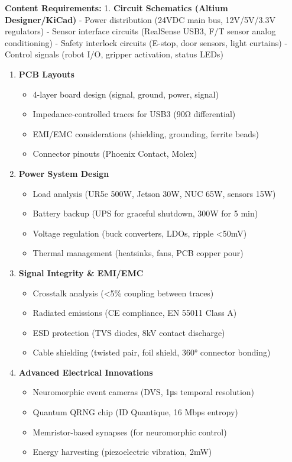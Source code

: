 \documentclass[
]{article}
\providecommand{\tightlist}{%
  \setlength{\itemsep}{0pt}\setlength{\parskip}{0pt}}
\begin{document}
\textbf{Content Requirements:} 1. \textbf{Circuit Schematics (Altium
Designer/KiCad)} - Power distribution (24VDC main bus, 12V/5V/3.3V
regulators) - Sensor interface circuits (RealSense USB3, F/T sensor
analog conditioning) - Safety interlock circuits (E-stop, door sensors,
light curtains) - Control signals (robot I/O, gripper activation, status
LEDs)

\begin{enumerate}
\def\labelenumi{\arabic{enumi}.}
\setcounter{enumi}{1}
\tightlist
\item
  \textbf{PCB Layouts}

  \begin{itemize}
  \tightlist
  \item
    4-layer board design (signal, ground, power, signal)
  \item
    Impedance-controlled traces for USB3 (90Ω differential)
  \item
    EMI/EMC considerations (shielding, grounding, ferrite beads)
  \item
    Connector pinouts (Phoenix Contact, Molex)
  \end{itemize}
\item
  \textbf{Power System Design}

  \begin{itemize}
  \tightlist
  \item
    Load analysis (UR5e 500W, Jetson 30W, NUC 65W, sensors 15W)
  \item
    Battery backup (UPS for graceful shutdown, 300W for 5 min)
  \item
    Voltage regulation (buck converters, LDOs, ripple \textless50mV)
  \item
    Thermal management (heatsinks, fans, PCB copper pour)
  \end{itemize}
\item
  \textbf{Signal Integrity \& EMI/EMC}

  \begin{itemize}
  \tightlist
  \item
    Crosstalk analysis (\textless5\% coupling between traces)
  \item
    Radiated emissions (CE compliance, EN 55011 Class A)
  \item
    ESD protection (TVS diodes, 8kV contact discharge)
  \item
    Cable shielding (twisted pair, foil shield, 360° connector bonding)
  \end{itemize}
\item
  \textbf{Advanced Electrical Innovations}

  \begin{itemize}
  \tightlist
  \item
    Neuromorphic event cameras (DVS, 1μs temporal resolution)
  \item
    Quantum QRNG chip (ID Quantique, 16 Mbps entropy)
  \item
    Memristor-based synapses (for neuromorphic control)
  \item
    Energy harvesting (piezoelectric vibration, 2mW)
  \end{itemize}
\end{enumerate}
\end{document}
